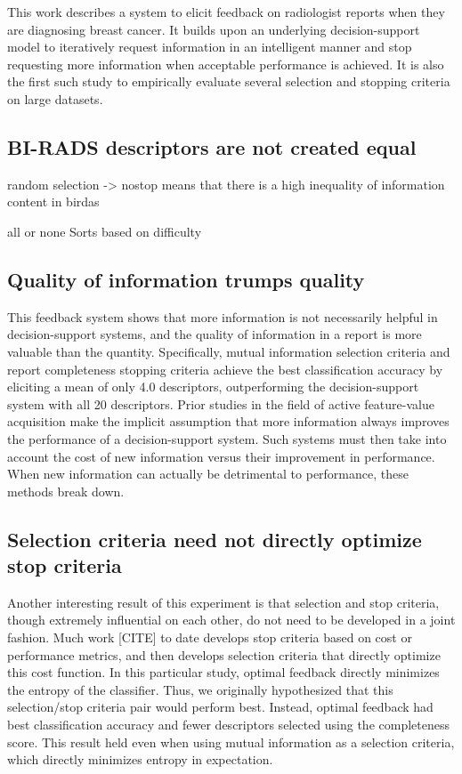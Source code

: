 This work describes a system to elicit feedback on radiologist reports when they are diagnosing breast cancer. It builds upon an underlying decision-support model to iteratively request information in an intelligent manner and stop requesting more information when acceptable performance is achieved. It is also the first such study to empirically evaluate several selection and stopping criteria on large datasets.

\subsection{BI-RADS descriptors are not created equal}
 random selection -> nostop means that there is a high inequality of information content in birdas

 all or none Sorts based on difficulty

\subsection{Quality of information trumps quality}
This feedback system shows that more information is not necessarily helpful in decision-support systems, and the quality of information in a report is more valuable than the quantity. Specifically, mutual information selection criteria and report completeness stopping criteria achieve the best classification accuracy by eliciting a mean of only 4.0 descriptors, outperforming the decision-support system with all 20 descriptors. Prior studies in the field of active feature-value acquisition make the implicit assumption that more information always improves the performance of a decision-support system. Such systems must then take into account the cost of new information versus their improvement in performance. When new information can actually be detrimental to performance, these methods break down.

\subsection{Selection criteria need not directly optimize stop criteria}
Another interesting result of this experiment is that selection and stop criteria, though extremely influential on each other, do not need to be developed in a joint fashion. Much work [CITE] to date develops stop criteria based on cost or performance metrics, and then develops selection criteria that directly optimize this cost function. In this particular study, optimal feedback directly minimizes the entropy of the classifier. Thus, we originally hypothesized that this selection/stop criteria pair would perform best. Instead, optimal feedback had best classification accuracy and fewer descriptors selected using the completeness score. This result held even when using mutual information as a selection criteria, which directly minimizes entropy in expectation.

